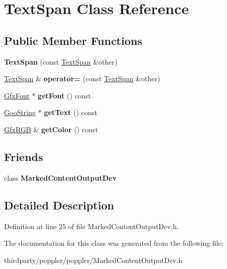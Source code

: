 \hypertarget{class_text_span}{}\section{Text\+Span Class Reference}
\label{class_text_span}
\subsection*{Public Member Functions}
\begin{DoxyCompactItemize}
\item 
\mbox{\label{class_text_span_ad3a87bee8e174d7f9bda9786db255b1b}} 
{\bfseries Text\+Span} (const \hyperlink{class_text_span}{Text\+Span} \&other)
\item 
\mbox{\label{class_text_span_a8d88645b1b9307849514544c74277261}} 
\hyperlink{class_text_span}{Text\+Span} \& {\bfseries operator=} (const \hyperlink{class_text_span}{Text\+Span} \&other)
\item 
\mbox{\label{class_text_span_a853706f1fe17cd096d0d18c3c4eaf65f}} 
\hyperlink{class_gfx_font}{Gfx\+Font} $\ast$ {\bfseries get\+Font} () const
\item 
\mbox{\label{class_text_span_a5915926aaef2eeca0850e4259ff6ae4d}} 
\hyperlink{class_goo_string}{Goo\+String} $\ast$ {\bfseries get\+Text} () const
\item 
\mbox{\label{class_text_span_aac7088389f4fd23a19b4b3d743ac5501}} 
\hyperlink{struct_gfx_r_g_b}{Gfx\+R\+GB} \& {\bfseries get\+Color} () const
\end{DoxyCompactItemize}
\subsection*{Friends}
\begin{DoxyCompactItemize}
\item 
\mbox{\label{class_text_span_a3130410193631ecfc1d2478b841e7f22}} 
class {\bfseries Marked\+Content\+Output\+Dev}
\end{DoxyCompactItemize}


\subsection{Detailed Description}


Definition at line 25 of file Marked\+Content\+Output\+Dev.\+h.



The documentation for this class was generated from the following file\+:\begin{DoxyCompactItemize}
\item 
thirdparty/poppler/poppler/Marked\+Content\+Output\+Dev.\+h\end{DoxyCompactItemize}
